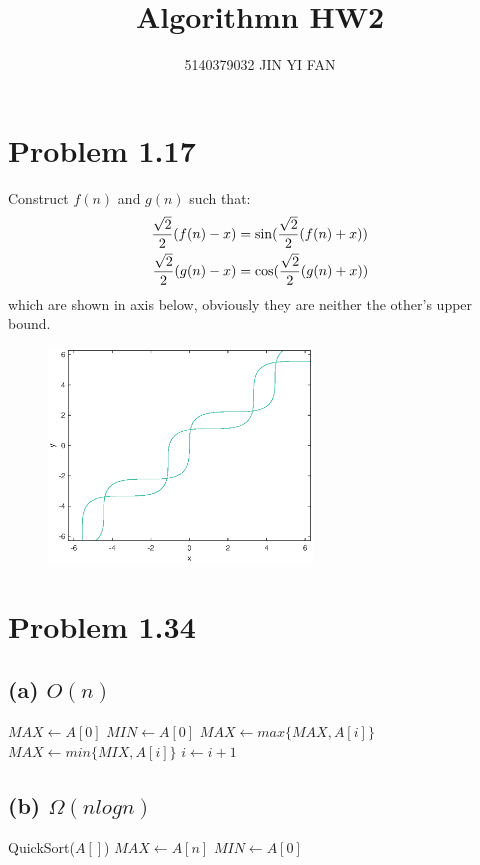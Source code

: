 \documentclass[a4paper]{article}
\title{\textbf{Algorithmn HW2}}
\author{5140379032 JIN YI FAN}
\date{}
\begin{document}
\large
\maketitle
\begin{spacing}{1.3}
\begin{multicols}{2}
\section*{Problem 1.17}
Construct $f(n)$ and $g(n)$ such that: 
\begin{align}
\frac{\sqrt{2}}{2}(f(n)-x)&=\sin(\frac{\sqrt{2}}{2}(f(n)+x)) \notag \\ 
\frac{\sqrt{2}}{2}(g(n)-x)&=\cos(\frac{\sqrt{2}}{2}(g(n)+x))  \notag
\end{align}
which are shown in axis below, obviously they are neither the other's upper bound.
\begin{figure}[H]
    \centering
    \includegraphics[width=7cm]{graph.eps}
\end{figure}

\section*{Problem 1.34}
\subsection*{(a) $O(n)$}
\begin{algorithmic}[1]
\STATE $MAX \leftarrow A[0]$
\STATE $MIN \leftarrow A[0]$
\STATE $MAX \leftarrow max\{MAX, A[i]\}$
\STATE $MAX \leftarrow min\{MIX, A[i]\}$
\STATE $i \gets i+1$
\ENDFOR
\end{algorithmic}

\subsection*{(b) $\Omega(nlogn)$}
\begin{algorithmic}[1]
\STATE QuickSort($A[]$)
\STATE $MAX \gets A[n]$
\STATE $MIN \gets A[0]$
\end{algorithmic}


\end{multicols}
\end{spacing}
\end{document}
